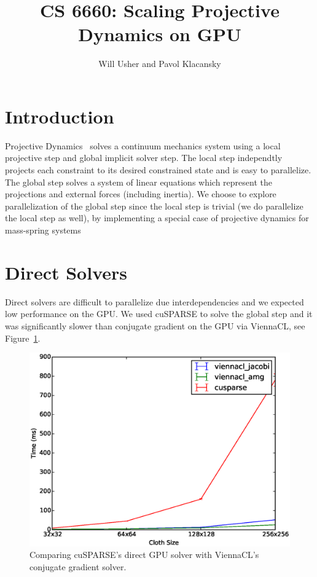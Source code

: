 \documentclass{article}
\title{CS 6660: Scaling Projective Dynamics on GPU}
\author{Will Usher and Pavol Klacansky}
\begin{document}
\maketitle

\section{Introduction}
Projective Dynamics~\cite{Bouaziz14} solves a continuum mechanics system using
a local projective step and global implicit solver step. The local step independtly
projects each constraint to its desired constrained state and is easy to parallelize.
The global step solves a system of linear equations which represent
the projections and external forces (including inertia). We choose to explore
parallelization of the global step since the local step is trivial (we do
parallelize the local step as well), by implementing
a special case of projective dynamics for mass-spring systems~\cite{Liu13}


\section{Direct Solvers}
Direct solvers are difficult to parallelize due interdependencies and we
expected low performance on the GPU. We used cuSPARSE to solve the global step and it
was significantly slower than conjugate gradient on the GPU via ViennaCL,
see Figure~\ref{fig:cusparse_vs_cg}.

\begin{figure}[htb!]
	\centering
	\includegraphics[width=0.9\linewidth]{img/cusparse_vs_cg}
	\caption{Comparing cuSPARSE's direct GPU solver with ViennaCL's conjugate gradient
		solver. \label{fig:cusparse_vs_cg}}
\end{figure}
\end{document}
